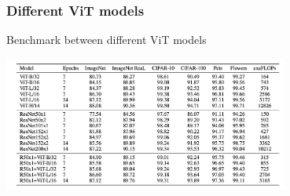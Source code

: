 \begin{frame}
\frametitle{Different ViT models}
Benchmark between different ViT models
\begin{center}
    \includegraphics[width=0.7\textwidth]{img/4-section/More-benchmark.png}
\end{center}

\end{frame}










